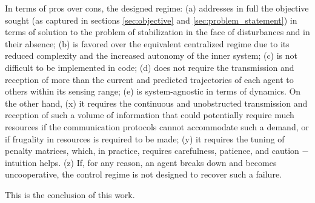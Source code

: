 In terms of pros over cons, the designed regime: (a) addresses in full the
objective sought (as captured in sections \eqref{sec:objective} and
\eqref{sec:problem_statement}) in terms of solution to the problem of
stabilization in the face of disturbances and in their absence; (b) is favored
over the equivalent centralized regime due to its reduced complexity and the
increased autonomy of the inner system; (c) is not difficult to be implemented
in code; (d) does not require the transmission and reception of more than the
current and predicted trajectories of each agent to others within its sensing
range; (e) is system-agnostic in terms of dynamics.
On the other hand, (x) it requires the continuous and unobstructed transmission
and reception of such a volume of information that could potentially require
much resources if the communication protocols cannot accommodate such a demand,
or if frugality in resources is required to be made;
(y) it requires the tuning of penalty matrices, which, in practice,
requires carefulness, patience, and caution $-$ intuition helps. (z) If, for any
reason, an agent breaks down and becomes uncooperative, the control regime is
not designed to recover such a failure.

This is the conclusion of this work.
